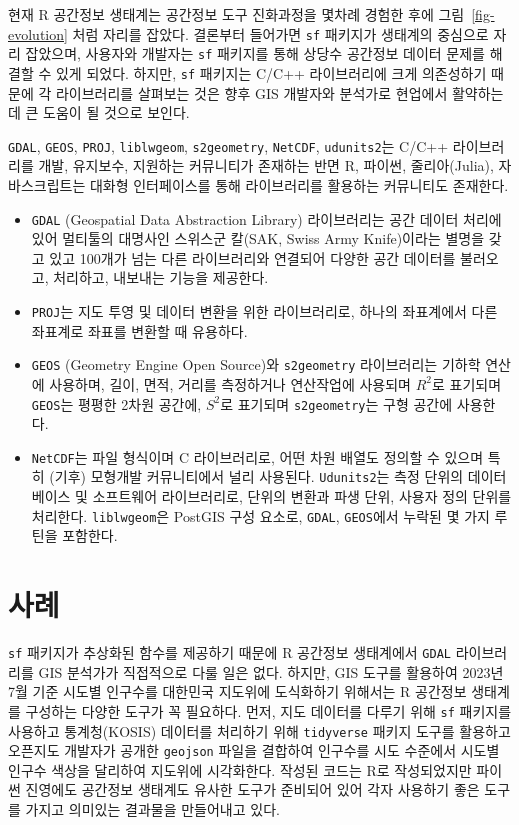 \documentclass[
  a4paper,showtrims,openright,hidelinks]{oblivoir}
\providecommand{\tightlist}{%
  \setlength{\itemsep}{0pt}\setlength{\parskip}{0pt}}\usepackage{longtable,booktabs,array}
\begin{document}
현재 R 공간정보 생태계는 공간정보 도구 진화과정을 몇차례 경험한 후에
그림~\ref{fig-evolution} 처럼 자리를 잡았다. 결론부터 들어가면
\texttt{sf} 패키지가 생태계의 중심으로 자리 잡았으며, 사용자와 개발자는
\texttt{sf} 패키지를 통해 상당수 공간정보 데이터 문제를 해결할 수 있게
되었다. 하지만, \texttt{sf} 패키지는 C/C++ 라이브러리에 크게 의존성하기
때문에 각 라이브러리를 살펴보는 것은 향후 GIS 개발자와 분석가로 현업에서
활약하는데 큰 도움이 될 것으로 보인다.

\texttt{GDAL}, \texttt{GEOS}, \texttt{PROJ}, \texttt{liblwgeom},
\texttt{s2geometry}, \texttt{NetCDF}, \texttt{udunits2}는 C/C++
라이브러리를 개발, 유지보수, 지원하는 커뮤니티가 존재하는 반면 R,
파이썬, 줄리아(Julia), 자바스크립트는 대화형 인터페이스를 통해
라이브러리를 활용하는 커뮤니티도 존재한다. \autocite{sds}

\begin{itemize}
\tightlist
\item
  \texttt{GDAL} (Geospatial Data Abstraction Library) 라이브러리는 공간
  데이터 처리에 있어 멀티툴의 대명사인 스위스군 칼(SAK, Swiss Army
  Knife)이라는 별명을 갖고 있고 100개가 넘는 다른 라이브러리와 연결되어
  다양한 공간 데이터를 불러오고, 처리하고, 내보내는 기능을 제공한다.
\item
  \texttt{PROJ}는 지도 투영 및 데이터 변환을 위한 라이브러리로, 하나의
  좌표계에서 다른 좌표계로 좌표를 변환할 때 유용하다.
\item
  \texttt{GEOS} (Geometry Engine Open Source)와 \texttt{s2geometry}
  라이브러리는 기하학 연산에 사용하며, 길이, 면적, 거리를 측정하거나
  연산작업에 사용되며 \(R^2\)로 표기되며 \texttt{GEOS}는 평평한 2차원
  공간에, \(S^2\)로 표기되며 \texttt{s2geometry}는 구형 공간에 사용한다.
\item
  \texttt{NetCDF}는 파일 형식이며 C 라이브러리로, 어떤 차원 배열도
  정의할 수 있으며 특히 (기후) 모형개발 커뮤니티에서 널리 사용된다.
  \texttt{Udunits2}는 측정 단위의 데이터베이스 및 소프트웨어
  라이브러리로, 단위의 변환과 파생 단위, 사용자 정의 단위를 처리한다.
  \texttt{liblwgeom}은 PostGIS 구성 요소로, \texttt{GDAL},
  \texttt{GEOS}에서 누락된 몇 가지 루틴을 포함한다.
  \autocite{Pebesma2016}
\end{itemize}

\section{사례}\label{uxc0acuxb840}

\texttt{sf} 패키지가 추상화된 함수를 제공하기 때문에 R 공간정보
생태계에서 \texttt{GDAL} 라이브러리를 GIS 분석가가 직접적으로 다룰 일은
없다. 하지만, GIS 도구를 활용하여 2023년 7월 기준 시도별 인구수를
대한민국 지도위에 도식화하기 위해서는 R 공간정보 생태계를 구성하는
다양한 도구가 꼭 필요하다. 먼저, 지도 데이터를 다루기 위해 \texttt{sf}
패키지를 사용하고 통계청(KOSIS) 데이터를 처리하기 위해
\texttt{tidyverse} 패키지 도구를 활용하고 오픈지도 개발자가 공개한
\texttt{geojson} 파일을 결합하여 인구수를 시도 수준에서 시도별 인구수
색상을 달리하여 지도위에 시각화한다. 작성된 코드는 R로 작성되었지만
파이썬 진영에도 공간정보 생태계도 유사한 도구가 준비되어 있어 각자
사용하기 좋은 도구를 가지고 의미있는 결과물을 만들어내고
있다.\autocite{wickham2019welcome}
\end{document}
